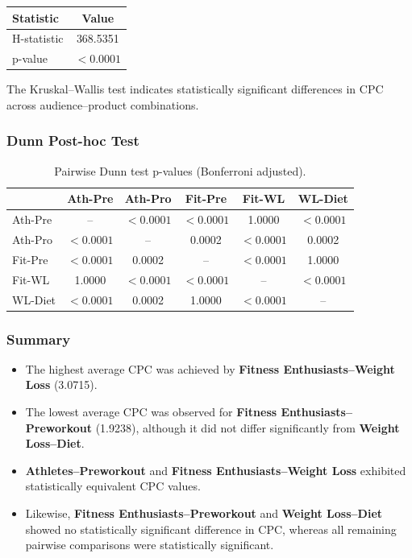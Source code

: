 \begin{table}[H]
	\centering
	\begin{tabular}{lc}
		\toprule
		Statistic & Value \\
		\midrule
		H-statistic & 368.5351 \\
		p-value & $<0.0001$ \\
		\bottomrule
	\end{tabular}
\end{table}

The Kruskal--Wallis test indicates statistically significant differences in CPC across audience--product combinations.

\vspace{0.3cm}

\subsubsection{Dunn Post-hoc Test}

\begin{table}[H]
	\centering
	\caption{Pairwise Dunn test p-values (Bonferroni adjusted).}
	\begin{tabular}{lccccc}
		\toprule
		& Ath-Pre & Ath-Pro & Fit-Pre & Fit-WL & WL-Diet \\
		\midrule
		Ath-Pre & -- & $<0.0001$ & $<0.0001$ & 1.0000 & $<0.0001$ \\
		Ath-Pro & $<0.0001$ & -- & 0.0002 & $<0.0001$ & 0.0002 \\
		Fit-Pre & $<0.0001$ & 0.0002 & -- & $<0.0001$ & 1.0000 \\
		Fit-WL & 1.0000 & $<0.0001$ & $<0.0001$ & -- & $<0.0001$ \\
		WL-Diet & $<0.0001$ & 0.0002 & 1.0000 & $<0.0001$ & -- \\
		\bottomrule
	\end{tabular}
\end{table}

\subsubsection{Summary}

\begin{itemize}
	\item The highest average CPC was achieved by \textbf{Fitness Enthusiasts--Weight Loss} (3.0715).
	\item The lowest average CPC was observed for \textbf{Fitness Enthusiasts--Preworkout} (1.9238), although it did not differ significantly from \textbf{Weight Loss--Diet}.
	\item \textbf{Athletes--Preworkout} and \textbf{Fitness Enthusiasts--Weight Loss} exhibited statistically equivalent CPC values.
	\item Likewise, \textbf{Fitness Enthusiasts--Preworkout} and \textbf{Weight Loss--Diet} showed no statistically significant difference in CPC, whereas all remaining pairwise comparisons were statistically significant.
\end{itemize}